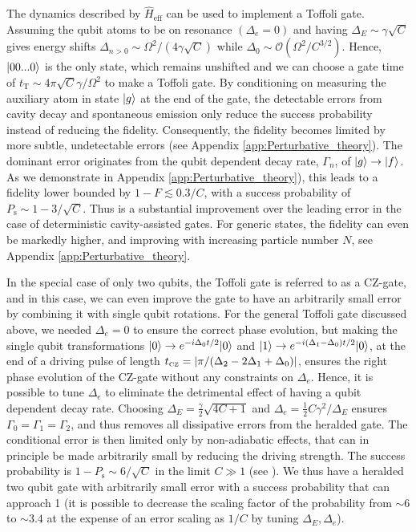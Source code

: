 The dynamics described by $\hat{H}_{\text{eff}}$ can be used to implement a
Toffoli gate. Assuming the qubit atoms to be on resonance $(\Delta_{e}=0)$ and
having $\Delta_{E}\sim\gamma\sqrt{C}$ gives energy shifts
$\Delta_{n>0}\sim\Omega^{2}/(4\gamma\sqrt{C})$ while
$\Delta_{0}\sim\mathcal{O}(\Omega^{2}/C^{3/2})$. Hence, $| 00...0 \rangle$ is the
only state, which remains unshifted and we can choose a gate time of
$t_{\text{T}}\sim4\pi\sqrt{C}\gamma/\Omega^{2}$ to make a Toffoli gate. By
conditioning on measuring the auxiliary atom in state $| g \rangle$ at the end of
the gate, the detectable errors from cavity decay and spontaneous emission only
reduce the success probability instead of reducing the fidelity. Consequently,
the fidelity becomes limited by more subtle, undetectable errors (see
Appendix \ref{app:Perturbative_theory}). The dominant error originates from the
qubit dependent decay rate, $\Gamma_{n}$, of $| g \rangle\to| f \rangle$. As we
demonstrate in Appendix \ref{app:Perturbative_theory}), this leads to a fidelity lower bounded by $1-F
\lesssim 0.3/C$, with a success probability of $P_{\text{s}} \sim 1 -
3/\sqrt{C}$. Thus is a substantial improvement over the leading error in the
case of deterministic cavity-assisted gates. For generic states, the fidelity
can even be markedly higher, and improving with increasing particle number $N$,
see Appendix \ref{app:Perturbative_theory}.

In the special case of only two qubits, the Toffoli gate is referred to as a
CZ-gate, and in this case, we can even improve the gate to have an arbitrarily
small error by combining it with single qubit rotations. For the general Toffoli
gate discussed above, we needed $\Delta_e=0$ to ensure the correct phase
evolution, but making the single qubit transformations $| 0 \rangle\to
e^{-i\Delta_{0}t/2}| 0 \rangle$ and $| 1 \rangle\to
e^{-i(\Delta_{1}-\Delta_{0})t/2}| 0 \rangle$, at the end of a driving pulse of
length $t_{\mbox{\tiny CZ}}=\left| \pi/(\Delta_{2}-2\Delta_{1}+\Delta_{0}) \right|$, ensures
the right phase evolution of the CZ-gate without any constraints on
$\Delta_{e}$. Hence, it is possible to tune $\Delta_{e}$ to eliminate the
detrimental effect of having a qubit dependent decay rate. Choosing
$\Delta_{E}=\frac{\gamma}{2}\sqrt{4C+1}$ and
$\Delta_{e}=\frac{1}{2}C\gamma^{2}/\Delta_{E}$ ensures
$\Gamma_0=\Gamma_1=\Gamma_2$, and thus removes all dissipative errors from the
heralded gate. The conditional error is then limited only by non-adiabatic
effects, that can in principle be made arbitrarily small by reducing the driving
strength. The success probability is $1-P_{\text{s}}\sim 6/\sqrt{C}$ in the
limit $C\gg1$ (see ).
We thus have a heralded two qubit gate with arbitrarily small error with a
success probability that can approach 1 (it is possible to decrease the scaling
factor of the probability from $\sim6$ to $\sim3.4$ at the expense of an error
scaling as $1/C$ by tuning $\Delta_{E},\Delta_{e}$).

